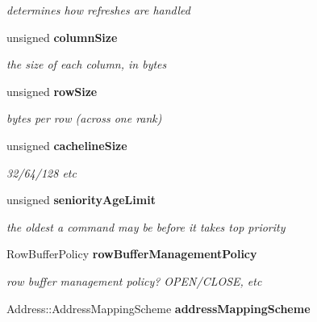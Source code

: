 \begin{CompactItemize}
\begin{CompactList}\small\item\em determines how refreshes are handled \item\end{CompactList}\item 
unsigned {\bf columnSize}\label{class_d_r_a_msim_i_i_1_1_system_configuration_1fb6f3d7c6efdcbd25bbdf35f71204f9}

\begin{CompactList}\small\item\em the size of each column, in bytes \item\end{CompactList}\item 
unsigned {\bf rowSize}\label{class_d_r_a_msim_i_i_1_1_system_configuration_2141e7d5594b88348cbec3eee17829d5}

\begin{CompactList}\small\item\em bytes per row (across one rank) \item\end{CompactList}\item 
unsigned {\bf cachelineSize}\label{class_d_r_a_msim_i_i_1_1_system_configuration_3892be18e60da949ed702bc22b6ae8a9}

\begin{CompactList}\small\item\em 32/64/128 etc \item\end{CompactList}\item 
unsigned {\bf seniorityAgeLimit}\label{class_d_r_a_msim_i_i_1_1_system_configuration_96a8cb7630b038cb600e45851d2594b4}

\begin{CompactList}\small\item\em the oldest a command may be before it takes top priority \item\end{CompactList}\item 
RowBufferPolicy {\bf rowBufferManagementPolicy}\label{class_d_r_a_msim_i_i_1_1_system_configuration_47741b7f154444248d9dc0dbd673684b}

\begin{CompactList}\small\item\em row buffer management policy? OPEN/CLOSE, etc \item\end{CompactList}\item 
Address::AddressMappingScheme {\bf addressMappingScheme}\label{class_d_r_a_msim_i_i_1_1_system_configuration_989520b46acc6c3aa13f13f39c2e0bb2}


\end{CompactItemize}

